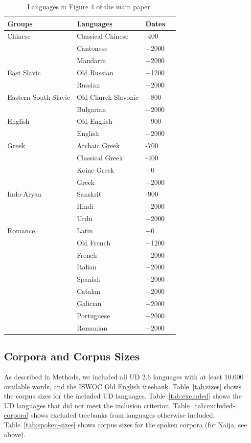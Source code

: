 \documentclass[11pt,a4paper]{article}
\begin{document}
\begin{table}
\begin{longtable}{l|lll} \hline
Groups & Languages & Dates \\ \hline\hline
Chinese & Classical Chinese & -400  \\
& Cantonese & +2000\\ 
& Mandarin & +2000 \\ \hline
East Slavic & Old Russian & +1200 \\
& Russian & +2000 \\ \hline
Eastern South Slavic & Old Church Slavonic & +800 \\
& Bulgarian  & +2000\\ \hline
English & Old English & +900 \\
& English  & +2000\\ \hline
Greek & Archaic Greek & -700 \\
      & Classical Greek & -400 \\
      & Koine Greek & +0\\
& Greek  & +2000\\ \hline
Indo-Aryan & Sanskrit & -900 \\
& Hindi  & +2000\\
& Urdu  & +2000\\ \hline
Romance & Latin &+0  \\
& Old French &+1200\\
& French  & +2000\\
& Italian & +2000\\
& Spanish & +2000\\
& Catalan & +2000\\
& Galician & +2000\\
& Portuguese & +2000\\
& Romanian & +2000\\ \hline
\end{longtable}
	\caption{Languages in Figure 4 of the main paper.}
\label{tab:traj}
\end{table}

\subsection{Corpora and Corpus Sizes}

As described in Methods, we included all UD 2.6 languages with at least 10,000 available words, and the ISWOC Old English treebank.
Table~\ref{tab:sizes} shows the corpus sizes for the included UD languages.
Table~\ref{tab:excluded} shows the UD languages that did not meet the inclusion criterion.
Table~\ref{tab:excluded-corpora} shows excluded treebanks from languages otherwise included.
Table~\ref{tab:spoken-sizes} shows corpus sizes for the spoken corpora (for Naija, see above).
\end{document}
